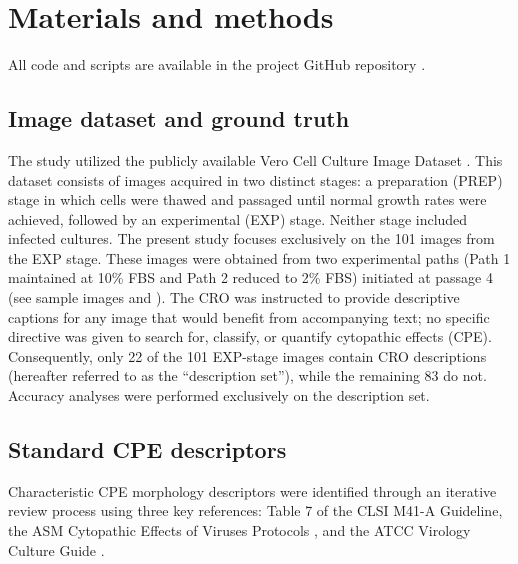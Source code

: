 \section*{Materials and methods}
\label{sec:methods}
All code and scripts are available in the project GitHub repository \cite{github-verocell}.

\subsection*{Image dataset and ground truth}
The study utilized the publicly available Vero Cell Culture Image Dataset \cite{mathews2025}. This dataset consists of images acquired in two distinct stages: a preparation (PREP) stage in which cells were thawed and passaged until normal growth rates were achieved, followed by an experimental (EXP) stage. Neither stage included infected cultures. The present study focuses exclusively on the 101 images from the EXP stage. These images were obtained from two experimental paths (Path 1 maintained at 10\% FBS and Path 2 reduced to 2\% FBS) initiated at passage 4 (see sample images  and ). The CRO was instructed to provide descriptive captions for any image that would benefit from accompanying text; no specific directive was given to search for, classify, or quantify cytopathic effects (CPE). Consequently, only 22 of the 101 EXP-stage images contain CRO descriptions (hereafter referred to as the ``description set''), while the remaining 83 do not. Accuracy analyses were performed exclusively on the description set.

\subsection*{Standard CPE descriptors}Characteristic CPE morphology descriptors were identified through an iterative review process using three key references: Table 7 of the CLSI M41-A Guideline\cite{clsi}, the ASM Cytopathic Effects of Viruses Protocols \cite{asm_cpe}, and the ATCC Virology Culture Guide \cite{atcc}. 


